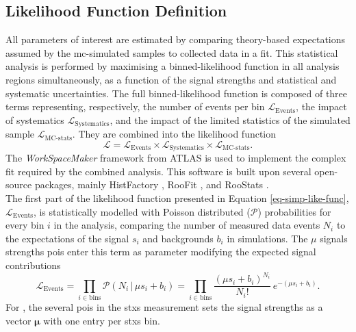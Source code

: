 \subsection{Likelihood Function Definition}\label{subsec-likelidef}
All parameters of interest are estimated by comparing theory-based expectations assumed by the \gls{mc}-simulated samples to collected data in a fit. This statistical analysis is performed by maximising a binned-likelihood function in all analysis regions simultaneously, as a function of the signal strengths and statistical and systematic uncertainties. The full binned-likelihood function is composed of three terms representing, respectively, the number of events per bin $\mathcal{L}_{\text{Events}}$, the impact of systematics $\mathcal{L}_{\text{Systematics}}$, and the impact of the limited statistics of the simulated sample $\mathcal{L}_{\text{MC-stats}}$. They are combined into the likelihood function
\begin{equation}\label{eq-simp-like-func}
    \mathcal{L} = \mathcal{L}_{\text{Events}} \times \mathcal{L}_{\text{Systematics}} \times \mathcal{L}_{\text{MC-stats}}.
\end{equation}
The \textit{WorkSpaceMaker} framework from ATLAS is used to implement the complex fit required by the combined analysis. This software is built upon several open-source packages, mainly HistFactory \cite{Cranmer:2012sba}, RooFit \cite{verkerke2003roofittoolkitdatamodeling}, and RooStats \cite{Moneta:2010pm}. \\

The first part of the likelihood function presented in Equation \ref{eq-simp-like-func}, $\mathcal{L}_{\text{Events}}$, is statistically modelled with Poisson distributed ($\mathcal{P}$) probabilities for every bin $i$ in the analysis, comparing the number of measured data events $N_i$ to the expectations of the signal $s_i$ and backgrounds $b_i$ in simulations. The $\mu$ signals strengths \glspl{poi} enter this term as parameter modifying the expected signal contributions \[\mathcal{L}_{\text{Events}} = \prod_{i\in \textrm{bins}} \mathcal{P}(N_i \,|\, \mu s_i + b_i) = \prod_{i\in \textrm{bins}} \frac{\left(\mu s_i + b_i\right)^{N_i}}{N_i!} \, e^{-\left(\mu s_i + b_i\right)}.\] For \vhb, the several \glspl{poi} in the \gls{stxs} measurement sets the signal strengths as a vector $\boldsymbol{\mu}$ with one entry per \gls{stxs} bin. \\

